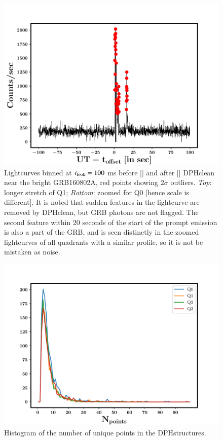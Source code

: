 \begin{figure}
\begin{center}
\includegraphics[scale=0.42]{GRB160802A--Q0--DPHclean_after--zoom}
\caption[The effect of DPHclean on the lightcurves of GRBs]{Lightcurves binned at $t_{{\rm look}} = 100$ ms before [\eL] and after [\eR] DPHclean near the bright GRB160802A, red points showing $2 \sigma$ outliers. \emph{Top}: longer stretch of Q1; \emph{Bottom}: zoomed for Q0 [hence scale is different]. It is noted that sudden features in the lightcurve are removed by DPHclean, but GRB photons are not flagged. The second feature within $20$ seconds of the start of the prompt emission is also a part of the GRB, and is seen distinctly in the zoomed lightcurves of all quadrants with a similar profile, so it is not be mistaken as noise.}
\label{fig:GRB_zoom}
\end{center}
\end{figure}


\begin{figure}
\begin{center}
\includegraphics[scale=0.5]{Histogram_of_Npoints--observed}
\caption[Histogram of the number of unique points in the DPHstructures]{Histogram of the number of unique points in the DPHstructures.}
\label{fig:histogram_of_observed_Npoints}
\end{center}
\end{figure}




